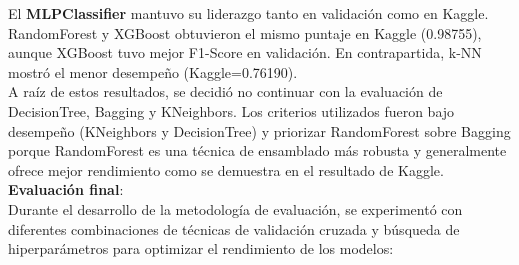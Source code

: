 \documentclass{article}
\begin{document}
El \textbf{MLPClassifier} mantuvo su liderazgo tanto en validación como en Kaggle. RandomForest y XGBoost obtuvieron el mismo puntaje en Kaggle (0.98755), aunque XGBoost tuvo mejor F1-Score en validación. En contrapartida, k-NN mostró el menor desempeño (Kaggle=0.76190).\\

A raíz de estos resultados, se decidió no continuar con la evaluación de DecisionTree, Bagging y KNeighbors. Los criterios utilizados fueron bajo desempeño (KNeighbors y DecisionTree) y priorizar RandomForest sobre Bagging porque RandomForest es una técnica de ensamblado más robusta y generalmente ofrece mejor rendimiento como se demuestra en el resultado de Kaggle.\\

\textbf{Evaluación final}:\\

Durante el desarrollo de la metodología de evaluación, se experimentó con diferentes combinaciones de técnicas de validación cruzada y búsqueda de hiperparámetros para optimizar el rendimiento de los modelos:
\end{document}
